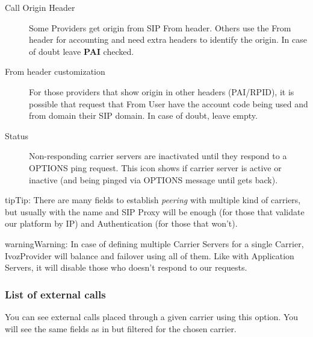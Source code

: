 \documentclass[letterpaper,10pt,english]{sphinxmanual}
\begin{document}
\begin{description}
\item[{Call Origin Header}] \leavevmode{}\label{administration_portal/brand/providers/carriers:term-call-origin-header}
Some Providers get origin from SIP From header. Others use the From
header for accounting and need extra headers to identify the origin.
In case of doubt leave \textbf{PAI} checked.

\item[{From header customization}] \leavevmode{}\label{administration_portal/brand/providers/carriers:term-from-header-customization}
For those providers that show origin in other headers (PAI/RPID), it is
possible that request that From User have the account code being used
and from domain their SIP domain. In case of doubt, leave empty.

\item[{Status}] \leavevmode{}\label{administration_portal/brand/providers/carriers:term-16}
Non-responding carrier servers are inactivated until they respond to a OPTIONS ping request. This icon shows
if carrier server is active or inactive (and being pinged via OPTIONS message until gets back).

\end{description}

\begin{notice}{tip}{Tip:}
There are many fields to establish \emph{peering} with multiple kind of
carriers, but usually with the name and SIP Proxy will be enough (for
those that validate our platform by IP) and Authentication (for those that
won't).
\end{notice}

\begin{notice}{warning}{Warning:}
In case of defining multiple Carrier Servers for a single
Carrier, IvozProvider will balance and failover using all of them.
Like with Application Servers, it will disable those who doesn't respond to
our requests.
\end{notice}


\subsubsection{List of external calls}
\label{administration_portal/brand/providers/carriers:list-of-external-calls}
You can see external calls placed through a given carrier using this option. You will see the same fields as in
{\hyperref[administration_portal/platform/external_calls:external\string-calls]{}} but filtered for the chosen carrier.
\end{document}
